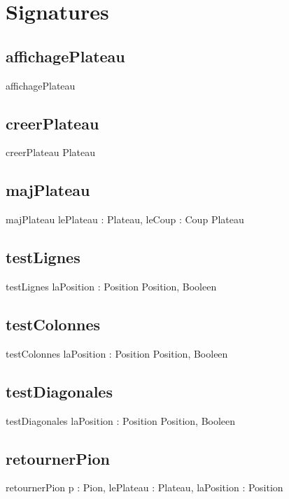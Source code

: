 \documentclass{article}
\begin{document}
\section{Signatures}
	\subsection{affichagePlateau}
		\begin{algorithme}
			\signatureprocedure
				{affichagePlateau}
				{}
		\end{algorithme}
	\subsection{creerPlateau}
		\begin{algorithme}
			\signaturefonction
				{creerPlateau}
				{}
				{Plateau}
		\end{algorithme}
	\subsection{majPlateau}
		\begin{algorithme}
			\signaturefonction
				{majPlateau}
				{lePlateau : Plateau, leCoup : Coup}
				{Plateau}
		\end{algorithme}
	\subsection{testLignes}
		\begin{algorithme}
			\signaturefonction
				{testLignes}
				{laPosition : Position}
				{Position, Booleen}
		\end{algorithme}
	\subsection{testColonnes}
		\begin{algorithme}
			\signaturefonction
				{testColonnes}
				{laPosition : Position}
				{Position, Booleen}
		\end{algorithme}
	\subsection{testDiagonales}
		\begin{algorithme}
			\signaturefonction
				{testDiagonales}
				{laPosition : Position}
				{Position, Booleen}
		\end{algorithme}
	\subsection{retournerPion}
		\begin{algorithme}
			\signatureprocedure
				{retournerPion}
				{p : Pion, lePlateau : Plateau, laPosition : Position}
		\end{algorithme}
\end{document}
